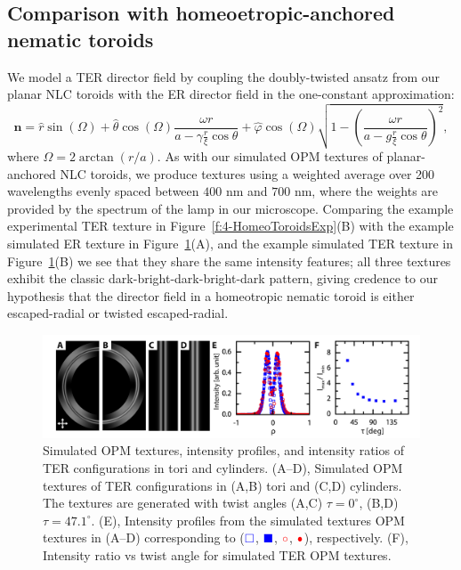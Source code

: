 \subsection{Comparison with homeoetropic-anchored nematic toroids}
We model a TER director field by coupling the doubly-twisted ansatz from our planar NLC toroids with the ER director field in the one-constant approximation:
\begin{equation}
  \mathbf{n} = \hat{r} \sin(\Omega)
  + \hat{\theta}\cos(\Omega)\frac{\omega r}{a-\gamma \frac{r}{\xi} \cos \theta}
  + \hat{\varphi}\cos(\Omega)\sqrt{1 - \left ( \frac{\omega r}{a-g \frac{r}{\xi} \cos \theta} \right )^2 },\label{e:4-TERansatz}
\end{equation}
where $\Omega = 2 \arctan(r/a)$.
As with our simulated OPM textures of planar-anchored NLC toroids, we produce textures using a weighted average over 200 wavelengths evenly spaced between $400$ nm and $700$ nm, where the weights are provided by the spectrum of the lamp in our microscope.
Comparing the example experimental TER texture in Figure~\ref{f:4-HomeoToroidsExp}(B) with the example simulated ER texture in Figure~\ref{f:4-I0I45vsTwist}(A), and the example simulated TER texture in Figure~\ref{f:4-I0I45vsTwist}(B) we see that they share the same intensity features; all three textures exhibit the classic dark-bright-dark-bright-dark pattern, giving credence to our hypothesis that the director field in a homeotropic nematic toroid is either escaped-radial or twisted escaped-radial.
\begin{figure}
  \centering
  \includegraphics{figures/C4/Ch4-Figs_I0I45vsTwist.png}
  \caption{Simulated OPM textures, intensity profiles, and intensity ratios of TER configurations in tori and cylinders.
  (A--D), Simulated OPM textures of TER configurations in (A,B) tori and (C,D) cylinders.
  The textures are generated with twist angles (A,C) $\tau = 0^{\circ}$, (B,D) $\tau = 47.1^\circ$.
  (E), Intensity profiles from the simulated textures OPM textures in (A--D) corresponding to (${\color{blue} \square}$, ${\color{blue} \blacksquare}$, ${\color{red} \circ}$, ${\color{red} \bullet}$), respectively.
  (F), Intensity ratio vs twist angle for simulated TER OPM textures.}\label{f:4-I0I45vsTwist}
\end{figure}

